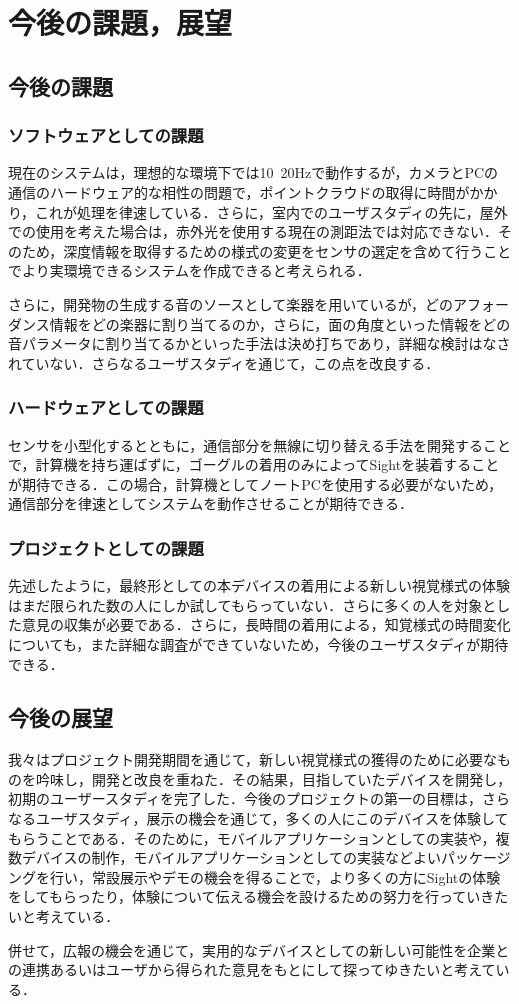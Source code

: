 \section{今後の課題，展望}
\subsection{今後の課題}
\subsubsection{ソフトウェアとしての課題}
現在のシステムは，理想的な環境下では10~20Hzで動作するが，カメラとPCの通信のハードウェア的な相性の問題で，ポイントクラウドの取得に時間がかかり，これが処理を律速している．さらに，室内でのユーザスタディの先に，屋外での使用を考えた場合は，赤外光を使用する現在の測距法では対応できない．そのため，深度情報を取得するための様式の変更をセンサの選定を含めて行うことでより実環境できるシステムを作成できると考えられる．

さらに，開発物の生成する音のソースとして楽器を用いているが，どのアフォーダンス情報をどの楽器に割り当てるのか，さらに，面の角度といった情報をどの音パラメータに割り当てるかといった手法は決め打ちであり，詳細な検討はなされていない．さらなるユーザスタディを通じて，この点を改良する．
\subsubsection{ハードウェアとしての課題}
センサを小型化するとともに，通信部分を無線に切り替える手法を開発することで，計算機を持ち運ばずに，ゴーグルの着用のみによってSightを装着することが期待できる．この場合，計算機としてノートPCを使用する必要がないため，通信部分を律速としてシステムを動作させることが期待できる．
\subsubsection{プロジェクトとしての課題}
先述したように，最終形としての本デバイスの着用による新しい視覚様式の体験はまだ限られた数の人にしか試してもらっていない．さらに多くの人を対象とした意見の収集が必要である．さらに，長時間の着用による，知覚様式の時間変化についても，また詳細な調査ができていないため，今後のユーザスタディが期待できる．

\subsection{今後の展望}
我々はプロジェクト開発期間を通じて，新しい視覚様式の獲得のために必要なものを吟味し，開発と改良を重ねた．その結果，目指していたデバイスを開発し，初期のユーザースタディを完了した．今後のプロジェクトの第一の目標は，さらなるユーザスタディ，展示の機会を通じて，多くの人にこのデバイスを体験してもらうことである．そのために，モバイルアプリケーションとしての実装や，複数デバイスの制作，モバイルアプリケーションとしての実装などよいパッケージングを行い，常設展示やデモの機会を得ることで，より多くの方にSightの体験をしてもらったり，体験について伝える機会を設けるための努力を行っていきたいと考えている．

併せて，広報の機会を通じて，実用的なデバイスとしての新しい可能性を企業との連携あるいはユーザから得られた意見をもとにして探ってゆきたいと考えている．
